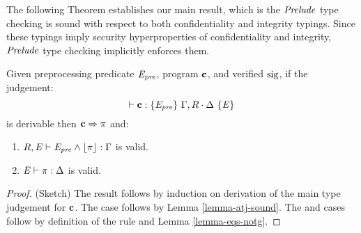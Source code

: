 The following Theorem establishes our main result, which
is the $\mathit{Prelude}$ type checking is sound with respect to both
confidentiality and integrity typings. Since these typings
imply security hyperproperties of confidentiality and integrity,
$\mathit{Prelude}$ type checking implicitly enforces them.
\begin{theorem}
  \label{theorem-mtj}
  Given preprocessing predicate $\mathit{E}_{\mathit{pre}}$, program $\mathbf{c}$, and verified $\mathrm{sig}$, if
  the judgement: $$\vdash \mathbf{c} : \{ \mathit{E}_{\mathit{pre}} \}\ \Gamma,R \cdot \Delta\ \{ \mathit{E} \}$$ is derivable then
  $\mathbf{c} \Rightarrow \pi$ and:
  \begin{enumerate}
  \item $R,\mathit{E} \vdash \mathit{E}_{\mathit{pre}} \wedge \lfloor \pi \rfloor : \Gamma$ is valid.
  \item $\mathit{E} \vdash \pi : \Delta$ is valid.
  \end{enumerate}
\end{theorem}

\begin{proof}
  (Sketch) The result follows by induction on derivation of the
  main type judgement for $\mathbf{c}$. The  case follows
  by Lemma \ref{lemma-atj-sound}. The  and 
  cases follow by definition of the  rule and Lemma
  \ref{lemma-eqs-notg}. 
\end{proof}
